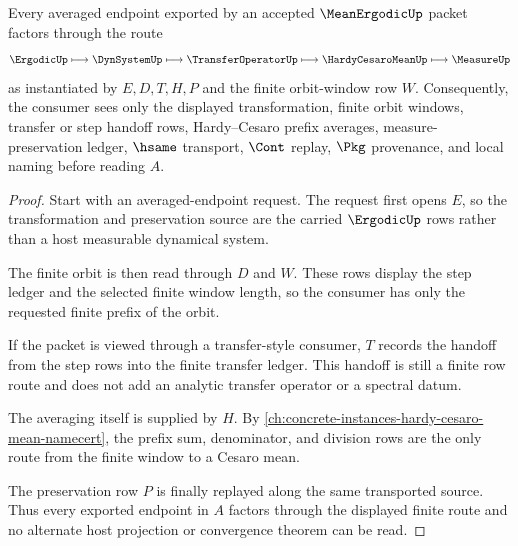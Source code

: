 \begin{theorem}
\label{thm:mean-ergodic-cesaro-average-handoff}
Every averaged endpoint exported by an accepted $\MeanErgodicUp$ packet factors through the route
$$
\ErgodicUp \longmapsto \DynSystemUp \longmapsto \TransferOperatorUp \longmapsto \HardyCesaroMeanUp \longmapsto \MeasureUp
$$
as instantiated by $E,D,T,H,P$ and the finite orbit-window row $W$. Consequently, the consumer sees only the displayed transformation, finite orbit windows, transfer or step handoff rows, Hardy--Cesaro prefix averages, measure-preservation ledger, $\hsame$ transport, $\Cont$ replay, $\Pkg$ provenance, and local naming before reading $A$.
\end{theorem}
\begin{proof}
Start with an averaged-endpoint request. The request first opens $E$, so the transformation and preservation source are the carried $\ErgodicUp$ rows rather than a host measurable dynamical system.

The finite orbit is then read through $D$ and $W$. These rows display the step ledger and the selected finite window length, so the consumer has only the requested finite prefix of the orbit.

If the packet is viewed through a transfer-style consumer, $T$ records the handoff from the step rows into the finite transfer ledger. This handoff is still a finite row route and does not add an analytic transfer operator or a spectral datum.

The averaging itself is supplied by $H$. By \autoref{ch:concrete-instances-hardy-cesaro-mean-namecert}, the prefix sum, denominator, and division rows are the only route from the finite window to a Cesaro mean.

The preservation row $P$ is finally replayed along the same transported source. Thus every exported endpoint in $A$ factors through the displayed finite route and no alternate host projection or convergence theorem can be read.
\end{proof}

